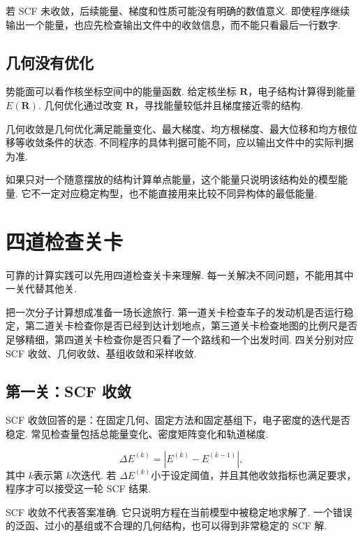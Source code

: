 \documentclass[UTF8,11pt,a4paper,openany]{ctexbook}
\begin{document}
若 SCF 未收敛，后续能量、梯度和性质可能没有明确的数值意义. 即使程序继续输出一个能量，也应先检查输出文件中的收敛信息，而不能只看最后一行数字. 

\subsection{几何没有优化}

势能面可以看作核坐标空间中的能量函数. 给定核坐标 $\mathbf R$，电子结构计算得到能量 $E(\mathbf R)$. 几何优化通过改变 $\mathbf R$，寻找能量较低并且梯度接近零的结构. 

\begin{definitionbox}
几何收敛是几何优化满足能量变化、最大梯度、均方根梯度、最大位移和均方根位移等收敛条件的状态. 不同程序的具体判据可能不同，应以输出文件中的实际判据为准. 
\end{definitionbox}

如果只对一个随意摆放的结构计算单点能量，这个能量只说明该结构处的模型能量. 它不一定对应稳定构型，也不能直接用来比较不同异构体的最低能量. 

\section{四道检查关卡}

可靠的计算实践可以先用四道检查关卡来理解. 每一关解决不同问题，不能用其中一关代替其他关. 

\begin{analogybox}
把一次分子计算想成准备一场长途旅行. 第一道关卡检查车子的发动机是否运行稳定，第二道关卡检查你是否已经到达计划地点，第三道关卡检查地图的比例尺是否足够精细，第四道关卡检查你是否只看了一个路线和一个出发时间. 四关分别对应 SCF 收敛、几何收敛、基组收敛和采样收敛. 
\end{analogybox}

\subsection{第一关：SCF 收敛}

SCF 收敛回答的是：在固定几何、固定方法和固定基组下，电子密度的迭代是否稳定. 常见检查量包括总能量变化、密度矩阵变化和轨道梯度. 

\[
\Delta E^{(k)}=\left|E^{(k)}-E^{(k-1)}\right|,
\]
其中 $k$表示第 $k$次迭代. 若 $\Delta E^{(k)}$小于设定阈值，并且其他收敛指标也满足要求，程序才可以接受这一轮 SCF 结果. 

\begin{limitbox}
SCF 收敛不代表答案准确. 它只说明方程在当前模型中被稳定地求解了. 一个错误的泛函、过小的基组或不合理的几何结构，也可以得到非常稳定的 SCF 解. 
\end{limitbox}
\end{document}
